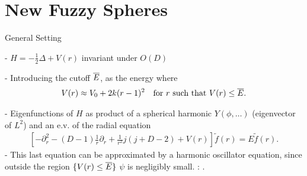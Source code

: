 \section{New Fuzzy Spheres}

\begin{frame}{General Setting} %
    
    - $H = - \frac{1}{2} \Delta + V(r)$ invariant under $O(D)$
    
    - Introducing the cutoff $\overline{E}$, as the energy where
    \begin{align}
        \label{eqn5}
            V(r) \approx V_0 + 2k(r-1)^2 && \text{for $r$ such that $V(r) \leq  \overline{E}$}.
    \end{align}
    
    - Eigenfunctions of $H$ as product of a spherical harmonic $Y(\phi, \dots)$ (eigenvector of $L^2$) and an e.v. of the radial equation 
    \begin{align}
        \label{eqn9}
        \left[-\partial_r^2 - (D-1) \frac{1}{r} \partial_r + \frac{1}{r^2} j(j+D-2) + V(r)\right] \tilde f(r) = E \tilde f(r).
    \end{align}
    - This last equation can be approximated by a harmonic oscillator equation, since outside the region $\{V(r) \leq \overline{E}\}$ $\psi$ is negligibly small.
    : .
        
    
    
    
    
\end{frame}




